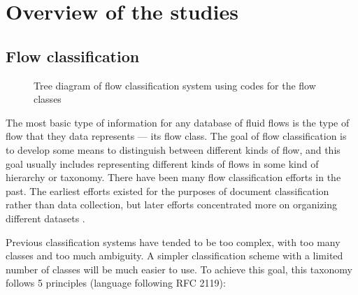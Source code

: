 %
\chapter{Overview of the studies}
\label{chp:overview-studies}


\section{Flow classification}
\label{sec:flow-classification}



\begin{figure}
    \centering
    
    \caption{Tree diagram of flow classification system using codes for the
    flow classes}
\end{figure}

The most basic type of information for any database of fluid flows is the type
of flow that they data represents --- its flow class.  The goal of flow
classification is to develop some means to distinguish between different kinds
of flow, and this goal usually includes representing different kinds of flows
in some kind of hierarchy or taxonomy.  There have been many flow
classification efforts in the past.  The earliest efforts existed for the
purposes of document classification \citep{ZWB+1944+deu+RPRT} rather than data
collection, but later efforts concentrated more on organizing different
datasets \citep{KlineSJ+1982+eng+BOOK+V3,ERCOFTAC+DBASE,AGARD+1998+eng+RPRT}.

Previous classification systems have tended to be too complex, with too many
classes and too much ambiguity.  A simpler classification scheme with a limited
number of classes will be much easier to use.  To achieve this goal, this
taxonomy follows 5 principles (language following RFC 2119):

